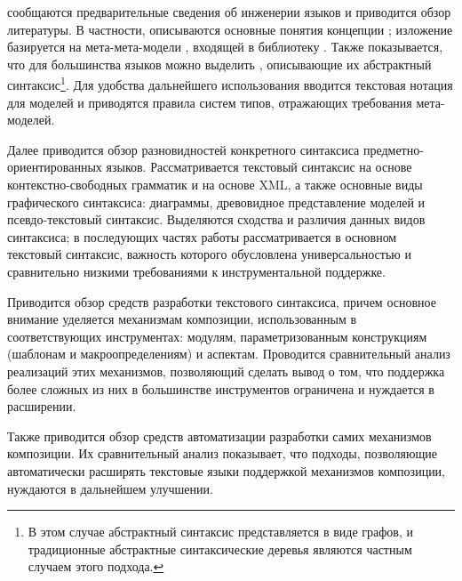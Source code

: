  сообщаются предварительные сведения об инженерии языков и приводится обзор литературы. В частности, описываются основные понятия концепции ; изложение базируется на мета-мета-модели , входящей в библиотеку . Также показывается, что для большинства языков можно выделить , описывающие их абстрактный синтаксис\footnote{В этом случае абстрактный синтаксис представляется в виде графов, и традиционные абстрактные синтаксические деревья являются частным случаем этого подхода.}. Для удобства дальнейшего использования вводится текстовая нотация для моделей и приводятся правила систем типов, отражающих требования мета-моделей. 

Далее приводится обзор разновидностей конкретного синтаксиса предметно-ориентированных языков. Рассматривается текстовый синтаксис на основе контекстно-свободных грамматик и на основе XML, а также основные виды графического синтаксиса: диаграммы, древовидное представление моделей и псевдо-текстовый синтаксис. Выделяются сходства и различия данных видов синтаксиса; в последующих частях работы рассматривается в основном текстовый синтаксис, важность которого обусловлена универсальностью и сравнительно низкими требованиями к инструментальной поддержке.

Приводится обзор средств разработки текстового синтаксиса, причем основное внимание уделяется механизмам композиции, использованным в соответствующих инструментах: модулям, параметризованным конструкциям (шаблонам и макроопределениям) и аспектам. Проводится сравнительный анализ реализаций этих механизмов, позволяющий сделать вывод о том, что поддержка более сложных из них в большинстве инструментов ограничена и нуждается в расширении.

Также приводится обзор средств автоматизации разработки самих механизмов композиции. Их сравнительный анализ показывает, что подходы, позволяющие автоматически расширять текстовые языки поддержкой механизмов композиции, нуждаются в дальнейшем улучшении.